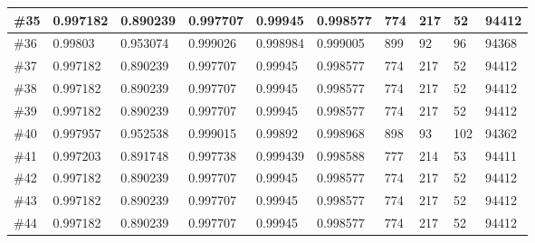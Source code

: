 \begin{longtable}{l|l|l|l|l|l|l|l|l|l}
\#35 & 0.997182 & 0.890239 & 0.997707 & 0.99945  & 0.998577 & 774 & 217 & 52  & 94412 \\ \hline
\#36 & 0.99803  & 0.953074 & 0.999026 & 0.998984 & 0.999005 & 899 & 92  & 96  & 94368 \\ \hline
\#37 & 0.997182 & 0.890239 & 0.997707 & 0.99945  & 0.998577 & 774 & 217 & 52  & 94412 \\ \hline
\#38 & 0.997182 & 0.890239 & 0.997707 & 0.99945  & 0.998577 & 774 & 217 & 52  & 94412 \\ \hline
\#39 & 0.997182 & 0.890239 & 0.997707 & 0.99945  & 0.998577 & 774 & 217 & 52  & 94412 \\ \hline
\#40 & 0.997957 & 0.952538 & 0.999015 & 0.99892  & 0.998968 & 898 & 93  & 102 & 94362 \\ \hline
\#41 & 0.997203 & 0.891748 & 0.997738 & 0.999439 & 0.998588 & 777 & 214 & 53  & 94411 \\ \hline
\#42 & 0.997182 & 0.890239 & 0.997707 & 0.99945  & 0.998577 & 774 & 217 & 52  & 94412 \\ \hline
\#43 & 0.997182 & 0.890239 & 0.997707 & 0.99945  & 0.998577 & 774 & 217 & 52  & 94412 \\ \hline
\#44 & 0.997182 & 0.890239 & 0.997707 & 0.99945  & 0.998577 & 774 & 217 & 52  & 94412 \\ \hline

\end{longtable}












